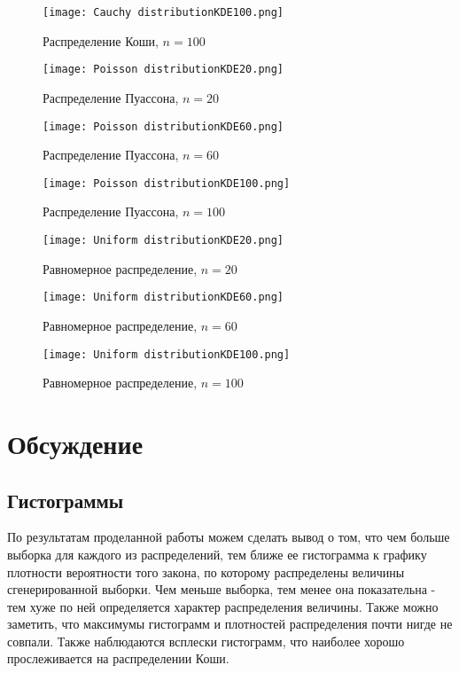 \documentclass[a4paper]{article}
\begin{document}
\begin{figure}[H]
	{\texttt{[image: Cauchy distributionKDE100.png]}}
		\caption{Распределение Коши, $n=100$} 
		\label{fig:normal}
	\end{figure}
\begin{figure}[H]
	{\texttt{[image: Poisson distributionKDE20.png]}}
		\caption{Распределение Пуассона, $n=20$} 
		\label{fig:normal}
	\end{figure}
	
\begin{figure}[H]
	{\texttt{[image: Poisson distributionKDE60.png]}}
		\caption{Распределение Пуассона, $n=60$} 
		\label{fig:normal}
	\end{figure}
	
\begin{figure}[H]
	{\texttt{[image: Poisson distributionKDE100.png]}}
		\caption{Распределение Пуассона, $n=100$} 
		\label{fig:normal}
	\end{figure}
	
\begin{figure}[H]
	{\texttt{[image: Uniform distributionKDE20.png]}}
		\caption{Равномерное распределение, $n=20$} 
		\label{fig:normal}
	\end{figure}
	
\begin{figure}[H]
	{\texttt{[image: Uniform distributionKDE60.png]}}
		\caption{Равномерное распределение, $n=60$} 
		\label{fig:normal}
	\end{figure}
\begin{figure}[H]
	{\texttt{[image: Uniform distributionKDE100.png]}}
		\caption{Равномерное распределение, $n=100$} 
		\label{fig:normal}
	\end{figure}
	
\section{Обсуждение}
\subsection{Гистограммы}
\noindent По результатам проделанной работы можем сделать вывод о том, что чем больше выборка для каждого из распределений, тем ближе ее гистограмма к графику плотности вероятности того закона, по которому распределены величины сгенерированной выборки. Чем меньше выборка, тем менее она показательна - тем хуже по ней определяется характер распределения величины. \newline Также можно заметить, что максимумы гистограмм и плотностей распределения почти нигде не совпали. Также наблюдаются всплески гистограмм,
что наиболее хорошо прослеживается на распределении Коши.
\end{document}

